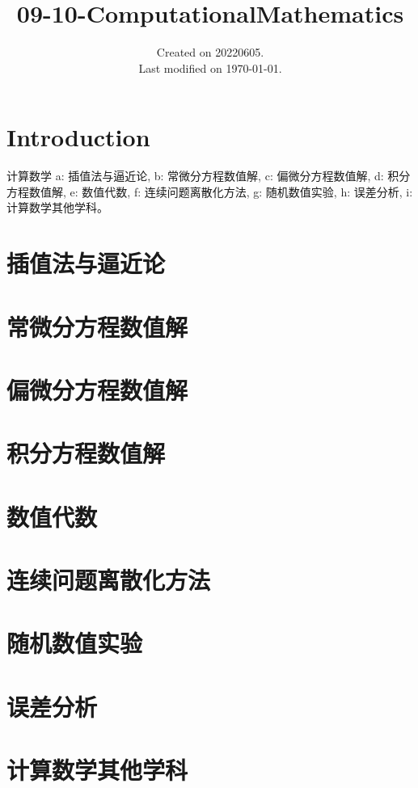\documentclass[UTF8]{../09-Mathematics}
\begin{document}
\title{09-10-ComputationalMathematics}
\date{Created on 20220605.\\   Last modified on \today.}
\maketitle
\tableofcontents


\chapter{Introduction}
计算数学
a: 插值法与逼近论, 
b: 常微分方程数值解, 
c: 偏微分方程数值解, 
d: 积分方程数值解, 
e: 数值代数, 
f: 连续问题离散化方法, 
g: 随机数值实验, 
h: 误差分析, 
i: 计算数学其他学科。

\chapter{插值法与逼近论}
\chapter{常微分方程数值解}
\chapter{偏微分方程数值解}
\chapter{积分方程数值解}
\chapter{数值代数}
\chapter{连续问题离散化方法}
\chapter{随机数值实验}
\chapter{误差分析}
\chapter{计算数学其他学科}
\end{document}
